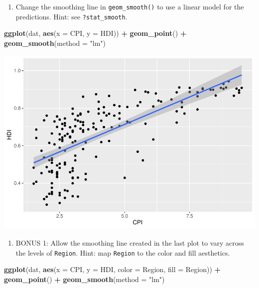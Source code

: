 \documentclass[
]{book}
\newenvironment{Shaded}{\begin{snugshade}}{\end{snugshade}}
\newcommand{\DataTypeTok}[1]{\textcolor[rgb]{0.13,0.29,0.53}{#1}}
\newcommand{\KeywordTok}[1]{\textcolor[rgb]{0.13,0.29,0.53}{\textbf{#1}}}
\newcommand{\NormalTok}[1]{#1}
\newcommand{\OperatorTok}[1]{\textcolor[rgb]{0.81,0.36,0.00}{\textbf{#1}}}
\newcommand{\StringTok}[1]{\textcolor[rgb]{0.31,0.60,0.02}{#1}}
\providecommand{\tightlist}{%
  \setlength{\itemsep}{0pt}\setlength{\parskip}{0pt}}
\begin{document}
\begin{alert}
\begin{enumerate}
\def\labelenumi{\arabic{enumi}.}
\setcounter{enumi}{3}
\tightlist
\item
  Change the smoothing line in \texttt{geom\_smooth()} to use a linear model for the predictions. Hint: see \texttt{?stat\_smooth}.
\end{enumerate}

\begin{Shaded}
\begin{Highlighting}[]
\KeywordTok{ggplot}\NormalTok{(dat, }\KeywordTok{aes}\NormalTok{(}\DataTypeTok{x =}\NormalTok{ CPI, }\DataTypeTok{y =}\NormalTok{ HDI)) }\OperatorTok{+}
\StringTok{  }\KeywordTok{geom\_point}\NormalTok{() }\OperatorTok{+}
\StringTok{  }\KeywordTok{geom\_smooth}\NormalTok{(}\DataTypeTok{method =} \StringTok{"lm"}\NormalTok{)}
\end{Highlighting}
\end{Shaded}

\includegraphics{R/Rgraphics/figures/unnamed-chunk-192-1.pdf}

\begin{enumerate}
\def\labelenumi{\arabic{enumi}.}
\setcounter{enumi}{4}
\tightlist
\item
  BONUS 1: Allow the smoothing line created in the last plot to vary across the levels of \texttt{Region}. Hint: map \texttt{Region} to the color and fill aesthetics.
\end{enumerate}

\begin{Shaded}
\begin{Highlighting}[]
\KeywordTok{ggplot}\NormalTok{(dat, }\KeywordTok{aes}\NormalTok{(}\DataTypeTok{x =}\NormalTok{ CPI, }\DataTypeTok{y =}\NormalTok{ HDI, }\DataTypeTok{color =}\NormalTok{ Region, }\DataTypeTok{fill =}\NormalTok{ Region)) }\OperatorTok{+}
\StringTok{  }\KeywordTok{geom\_point}\NormalTok{() }\OperatorTok{+}
\StringTok{  }\KeywordTok{geom\_smooth}\NormalTok{(}\DataTypeTok{method =} \StringTok{"lm"}\NormalTok{)}
\end{Highlighting}
\end{Shaded}


\end{alert}
\end{document}
